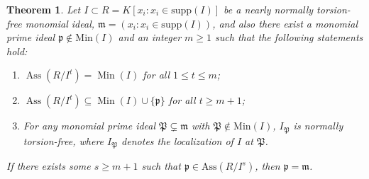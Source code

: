 \documentclass[11pt]{amsart}
\newtheorem{theorem}{Theorem}[section]
\begin{document}
\begin{theorem}\label{NNTF}  
Let $I \subset R = K[x_i : x_i\in \mathrm{supp}(I)]$ be a nearly normally torsion-free monomial ideal, $\mathfrak{m}=(x_i : x_i\in \mathrm{supp}(I))$, and also   there exist  a monomial prime ideal $\mathfrak{p}\notin \mathrm{Min}(I)$ 
and an integer $m \ge 1$ such that  the following statements hold:
\begin{enumerate}
\item[(i)]  $\operatorname{Ass}(R/I^t) = \operatorname{Min}(I)$ for all $1 \le t \le m$;
\item[(ii)]   $\operatorname{Ass}(R/I^t) \subseteq \operatorname{Min}(I) \cup \{\mathfrak{p}\}$ for all $t \ge m+1$;
\item[(iii)]  For any  monomial prime ideal $\mathfrak{P} \subsetneq \mathfrak{m}$ with $\mathfrak{P}\notin \mathrm{Min}(I)$, $I_{\mathfrak{P}}$ is normally torsion-free, where 
\(I_{\mathfrak P}\) denotes the localization of  \(I\) at  \(\mathfrak P\). 
\end{enumerate}
 If there exists some $s\geq m+1$ such that  $\mathfrak{p}\in \mathrm{Ass}(R/I^s)$, then  $\mathfrak{p}=\mathfrak{m}$.  
    \end{theorem}
\end{document}
